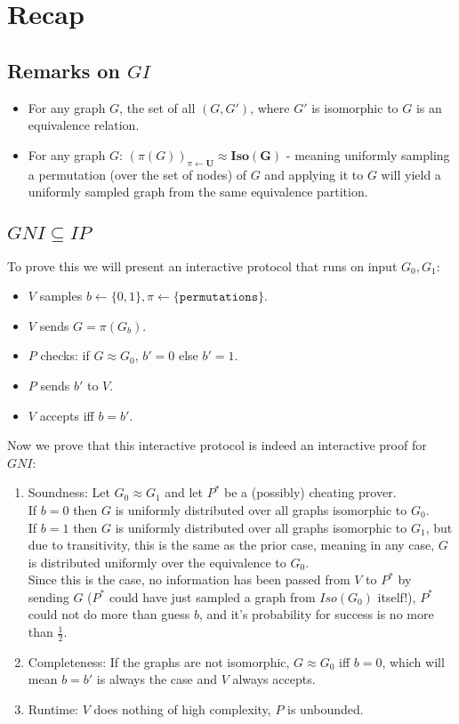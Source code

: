 \section{Recap}
\subsection{Remarks on $GI$}
\begin{itemize}
    \item For any graph $G$, the set of all $(G,G')$, where $G'$ is isomorphic to $G$ is an equivalence relation.
    \item For any graph $G$: $(\pi(G))_{\pi\leftarrow\mathbf{U}}\approx\mathbf{Iso(G)}$ - meaning uniformly sampling a permutation (over the set of nodes) of $G$ and applying it to $G$ will yield a uniformly sampled graph from the same equivalence partition.
\end{itemize}
\subsection{$GNI\subseteq IP$}
To prove this we will present an interactive protocol that runs on input $G_0, G_1$:
\begin{itemize}
    \item $V$ samples $b\leftarrow \{0,1\},\pi\leftarrow \{\texttt{permutations}\}$.
    \item $V$ sends $G=\pi(G_b)$.
    \item $P$ checks: if $G\approx G_0$, $b'=0$ else $b'=1$.
    \item $P$ sends $b'$ to $V$.
    \item $V$ accepts iff $b=b'$.
\end{itemize}
Now we prove that this interactive protocol is indeed an interactive proof for $GNI$:
\begin{enumerate}
    \item Soundness:
    Let $G_0\approx G_1$ and let $P^*$ be a (possibly) cheating prover.\\
    If $b=0$ then $G$ is uniformly distributed over all graphs isomorphic to $G_0$.\\ If $b=1$ then $G$ is uniformly distributed over all graphs isomorphic to $G_1$, but due to transitivity, this is the same as the prior case, meaning in any case, $G$ is distributed uniformly over the equivalence to $G_0$.\\
    Since this is the case, no information has been passed from $V$ to $P^*$ by sending $G$ ($P^*$ could have just sampled a graph from $Iso(G_0)$ itself!), $P^*$ could not do more than guess $b$, and it's probability for success is no more than $\frac{1}{2}$.
    \item Completeness: If the graphs are not isomorphic, $G\approx G_0$ iff $b=0$, which will mean $b=b'$ is always the case and $V$ always accepts.
    \item Runtime: $V$ does nothing of high complexity, $P$ is unbounded.
\end{enumerate}


